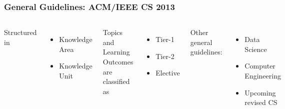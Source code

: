 \documentclass[aspectratio=169]{beamer}
\begin{document}
\begin{frame}
  \frametitle{General Guidelines: ACM/IEEE CS 2013}

  \begin{columns}
    
    
  Structured in
  \begin{itemize}
  \item Knowledge Area
  \item Knowledge Unit
  \end{itemize}

  Topics and Learning Outcomes are classified as
  \begin{itemize}
  \item Tier-1
  \item Tier-2
  \item Elective
  \end{itemize}
  
  Other general guidelines:
  \begin{itemize}
  \item Data Science
  \item Computer Engineering
  \item Upcoming revised CS
  \end{itemize}
  
    
  \includegraphics[width=\linewidth]{figs/cs2013-ALpage1.png}

  \end{columns}
\end{frame}
\end{document}
